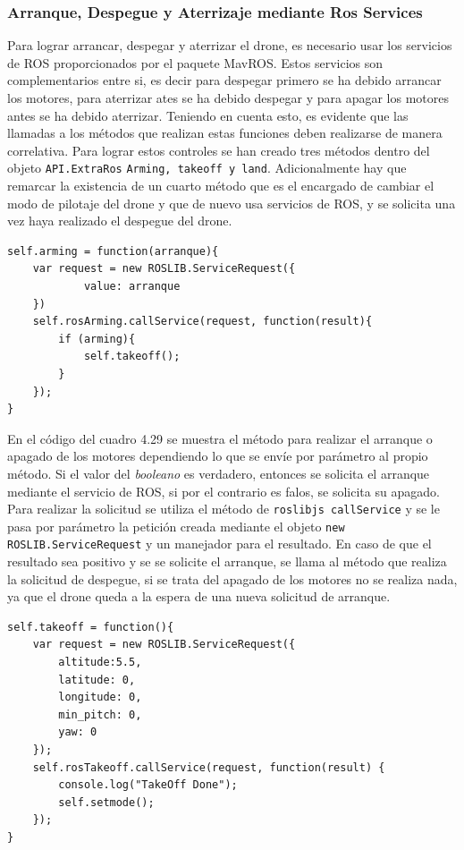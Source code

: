 \subsubsection{Arranque, Despegue y Aterrizaje mediante Ros Services}

Para lograr arrancar, despegar y aterrizar el drone, es necesario usar los servicios de ROS proporcionados por el paquete MavROS. Estos servicios son complementarios entre si, es decir para despegar primero se ha debido arrancar los motores, para aterrizar ates se ha debido despegar y para apagar los motores antes se ha debido aterrizar. Teniendo en cuenta esto, es evidente que las llamadas a los métodos que realizan estas funciones deben realizarse de manera correlativa. Para lograr estos controles se han creado tres métodos dentro del objeto \texttt{API.ExtraRos} \texttt{Arming, takeoff y land}. Adicionalmente hay que remarcar la existencia de un cuarto método que es el encargado de cambiar el modo de pilotaje del drone y que de nuevo usa servicios de ROS, y se solicita una vez haya realizado el despegue del drone.

\begin{lstlisting}[caption= Método para arrancar o apagar los motores del drone, label=cod.arming]
self.arming = function(arranque){
	var request = new ROSLIB.ServiceRequest({
			value: arranque
	})
	self.rosArming.callService(request, function(result){
		if (arming){
			self.takeoff();
		} 
	});
}
\end{lstlisting}

En el código del cuadro 4.29 se muestra el método para realizar el arranque o apagado de los motores dependiendo lo que se envíe por parámetro al propio método. Si el valor del \textit{booleano} es verdadero, entonces se solicita el arranque mediante el servicio de ROS, si por el contrario es falos, se solicita su apagado. Para realizar la solicitud se utiliza el método de \texttt{roslibjs callService} y se le pasa por parámetro la petición creada mediante el objeto \texttt{new ROSLIB.ServiceRequest} y un manejador para el resultado. En caso de que el resultado sea positivo y se se solicite el arranque, se llama al método que realiza la solicitud de despegue, si se trata del apagado de los motores no se realiza nada, ya que el drone queda a la espera de una nueva solicitud de arranque.

\begin{lstlisting}[caption= Método para arrancar o apagar los motores del drone, label=cod.takeoff]
self.takeoff = function(){
	var request = new ROSLIB.ServiceRequest({
		altitude:5.5,
		latitude: 0,
		longitude: 0,
		min_pitch: 0,
		yaw: 0
	});
	self.rosTakeoff.callService(request, function(result) {
		console.log("TakeOff Done");
		self.setmode();
	});
}
\end{lstlisting}

